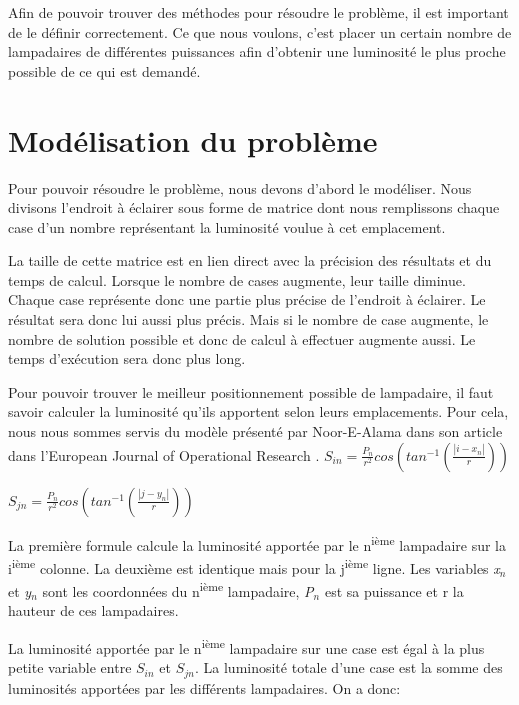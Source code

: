 Afin de pouvoir trouver des m\'{e}thodes pour r\'{e}soudre le probl\`{e}me, il est important de le d\'{e}finir correctement. Ce que nous voulons, c'est placer un certain nombre de lampadaires de différentes puissances afin d'obtenir une luminosit\'{e} le plus proche possible de ce qui est demand\'{e}.

\section{Mod\'{e}lisation du probl\`{e}me}
Pour pouvoir r\'{e}soudre le probl\`{e}me, nous devons d'abord le mod\'{e}liser.  Nous divisons l'endroit \`{a} \'{e}clairer sous forme de matrice dont nous remplissons chaque case d'un nombre repr\'{e}sentant la luminosit\'{e} voulue \`{a} cet emplacement.

La taille de cette matrice est en lien direct avec la pr\'{e}cision des r\'{e}sultats et du temps de calcul. Lorsque le nombre de cases augmente, leur taille diminue. Chaque case repr\'{e}sente donc une partie plus pr\'{e}cise de l'endroit \`{a} \'{e}clairer. Le r\'{e}sultat sera donc lui aussi plus pr\'{e}cis. Mais si le nombre de case augmente, le nombre de solution possible et donc de calcul \`{a} effectuer augmente aussi. Le temps d'ex\'{e}cution sera donc plus long.

Pour pouvoir trouver le meilleur positionnement possible de lampadaire, il faut savoir calculer la luminosité qu'ils apportent selon leurs emplacements. Pour cela, nous nous sommes servis du modèle présenté par Noor-E-Alama dans son article dans l'European Journal of Operational Research \cite{mainref}.
$
S_{in}=\frac{P_{n}}{r^{2}} cos \left (tan^{-1}\left (\frac{\left |i-x_{n}  \right |}{r}  \right )   \right )
$


$
S_{jn}=\frac{P_{n}}{r^{2}} cos \left (tan^{-1}\left (\frac{\left |j-y_{n}  \right |}{r}  \right )   \right )
$

La première formule calcule la luminosité apportée par le n\textsuperscript{ième} lampadaire sur la i\textsuperscript{ième} colonne. La deuxième est identique mais pour la j\textsuperscript{ième} ligne. Les variables \textit{x}$_{n}$ et \textit{y}$_{n}$ sont les coordonnées du n\textsuperscript{ième} lampadaire, \textit{P}$_{n}$ est sa puissance et r la hauteur de ces lampadaires.

La luminosité apportée par le n\textsuperscript{ième} lampadaire sur une case est égal à la plus petite variable entre $S_{in}$ et $S_{jn}$.
La luminosité totale d'une case est la somme des luminosités apportées par les différents lampadaires.
On a donc:

